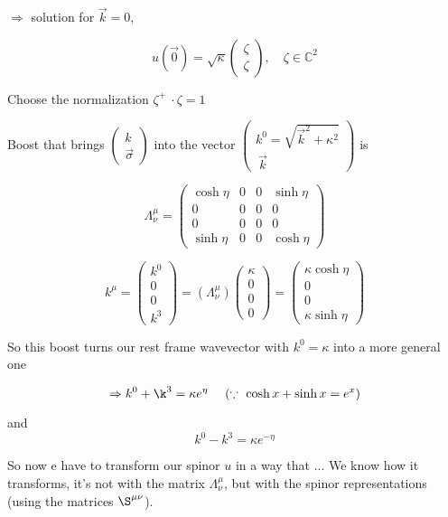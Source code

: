\documentclass[11pt]{article}
\begin{document}
$\Rightarrow$ solution for $\vec{k} = 0$,

\[	  u(\vec{0}) = \sqrt{\kappa}\begin{pmatrix}
	\zeta \\ \zeta
\end{pmatrix}, \quad \zeta \in \mathbb{C}^2	 \]

Choose the normalization $\zeta^+\ \cdot \zeta = 1$

Boost that brings $\begin{pmatrix}
	k\\ \vec{\sigma}
\end{pmatrix}$ into the vector $\begin{pmatrix}
	k^0 = \sqrt{\vec{k}^2 + \kappa^2}\\ \
			\vec{k}
\end{pmatrix}$ is


		\[ \Lambda^\mu_\nu = \begin{pmatrix}
			\cosh \eta & 0 & 0 & \sinh \eta\\
			0 & 0 & 0 & 0 \\
			0 & 0 & 0 & 0\\
			\sinh \eta & 0 & 0 & \cosh \eta
		\end{pmatrix}\]

	$$k^\mu = \begin{pmatrix}
		k^0 \\ 0 \\ 0 \\ k^3
	\end{pmatrix} = (\Lambda^\mu_\nu)\begin{pmatrix}
	\kappa \\ 0 \\ 0 \\ 0
\end{pmatrix} = \begin{pmatrix}
		\kappa \cosh \eta\\ 0 \\ 0 \\ \kappa \sinh \eta
\end{pmatrix}$$

So this boost turns our rest frame wavevector with $k^0 = \kappa$ into a more general one

\[ \Rightarrow k^0 +  \k^3 = \kappa e^\eta\    \quad (\because\ \cosh x + \sinh x = e^{x})\]

and \[ k^0 - k^3 = \kappa e^{-\eta} \]

	So now e have to transform our spinor $u$ in a way that ... We know how it transforms, it's not with the matrix $\Lambda^\mu_\nu$, but with the spinor representations (using the matrices $\S^{\mu\nu}$).
	
\end{document}
